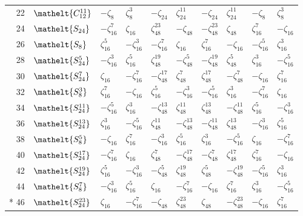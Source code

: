 \documentclass[10pt,a4paper]{article}
\numberwithin{equation}{section}
\newcommand{\eltfont}[1]{{\let\sigma\eltsigma\mathelt{#1}}}
\newcommand{\cls}[1]{\eltfont{#1}}
\newcommand{\rootunity}[1]{\zeta_{#1}}
\begin{document}
{\begin{longtable}{@{}rlllllllll@{}}
22 & $\cls{C_{12}^{11}}$ & $-\rootunity{8}$ & $\rootunity{8}^{3}$ & $-\rootunity{24}$ & $\rootunity{24}^{11}$ & $-\rootunity{24}$ & $\rootunity{24}^{11}$ & $-\rootunity{8}$ & $\rootunity{8}^{3}$\\
24 & $\cls{S_{24}}$ & $-\rootunity{16}^{7}$ & $\rootunity{16}$ & $\rootunity{48}^{23}$ & $-\rootunity{48}$ & $-\rootunity{48}^{23}$ & $\rootunity{48}$ & $\rootunity{16}^{7}$ & $-\rootunity{16}$\\
26 & $\cls{S_{8}}$ & $\rootunity{16}^{5}$ & $-\rootunity{16}^{3}$ & $-\rootunity{16}^{7}$ & $\rootunity{16}$ & $\rootunity{16}^{7}$ & $-\rootunity{16}$ & $-\rootunity{16}^{5}$ & $\rootunity{16}^{3}$\\
28 & $\cls{S_{24}^{5}}$ & $-\rootunity{16}^{3}$ & $\rootunity{16}^{5}$ & $\rootunity{48}^{19}$ & $-\rootunity{48}^{5}$ & $-\rootunity{48}^{19}$ & $\rootunity{48}^{5}$ & $\rootunity{16}^{3}$ & $-\rootunity{16}^{5}$\\
30 & $\cls{S_{24}^{7}}$ & $\rootunity{16}$ & $-\rootunity{16}^{7}$ & $-\rootunity{48}^{17}$ & $\rootunity{48}^{7}$ & $\rootunity{48}^{17}$ & $-\rootunity{48}^{7}$ & $-\rootunity{16}$ & $\rootunity{16}^{7}$\\
32 & $\cls{S_{8}^{3}}$ & $\rootunity{16}^{7}$ & $-\rootunity{16}$ & $\rootunity{16}^{5}$ & $-\rootunity{16}^{3}$ & $-\rootunity{16}^{5}$ & $\rootunity{16}^{3}$ & $-\rootunity{16}^{7}$ & $\rootunity{16}$\\
34 & $\cls{S_{24}^{11}}$ & $-\rootunity{16}^{5}$ & $\rootunity{16}^{3}$ & $-\rootunity{48}^{13}$ & $\rootunity{48}^{11}$ & $\rootunity{48}^{13}$ & $-\rootunity{48}^{11}$ & $\rootunity{16}^{5}$ & $-\rootunity{16}^{3}$\\
36 & $\cls{S_{24}^{13}}$ & $\rootunity{16}^{3}$ & $-\rootunity{16}^{5}$ & $\rootunity{48}^{11}$ & $-\rootunity{48}^{13}$ & $-\rootunity{48}^{11}$ & $\rootunity{48}^{13}$ & $-\rootunity{16}^{3}$ & $\rootunity{16}^{5}$\\
38 & $\cls{S_{8}^{5}}$ & $-\rootunity{16}$ & $\rootunity{16}^{7}$ & $-\rootunity{16}^{3}$ & $\rootunity{16}^{5}$ & $\rootunity{16}^{3}$ & $-\rootunity{16}^{5}$ & $\rootunity{16}$ & $-\rootunity{16}^{7}$\\
40 & $\cls{S_{24}^{17}}$ & $-\rootunity{16}^{7}$ & $\rootunity{16}$ & $\rootunity{48}^{7}$ & $-\rootunity{48}^{17}$ & $-\rootunity{48}^{7}$ & $\rootunity{48}^{17}$ & $\rootunity{16}^{7}$ & $-\rootunity{16}$\\
42 & $\cls{S_{24}^{19}}$ & $\rootunity{16}^{5}$ & $-\rootunity{16}^{3}$ & $-\rootunity{48}^{5}$ & $\rootunity{48}^{19}$ & $\rootunity{48}^{5}$ & $-\rootunity{48}^{19}$ & $-\rootunity{16}^{5}$ & $\rootunity{16}^{3}$\\
44 & $\cls{S_{8}^{7}}$ & $-\rootunity{16}^{3}$ & $\rootunity{16}^{5}$ & $\rootunity{16}$ & $-\rootunity{16}^{7}$ & $-\rootunity{16}$ & $\rootunity{16}^{7}$ & $\rootunity{16}^{3}$ & $-\rootunity{16}^{5}$\\*
46 & $\cls{S_{24}^{23}}$ & $\rootunity{16}$ & $-\rootunity{16}^{7}$ & $-\rootunity{48}$ & $\rootunity{48}^{23}$ & $\rootunity{48}$ & $-\rootunity{48}^{23}$ & $-\rootunity{16}$ & $\rootunity{16}^{7}$\\
\bottomrule\end{longtable}}
\end{document}
